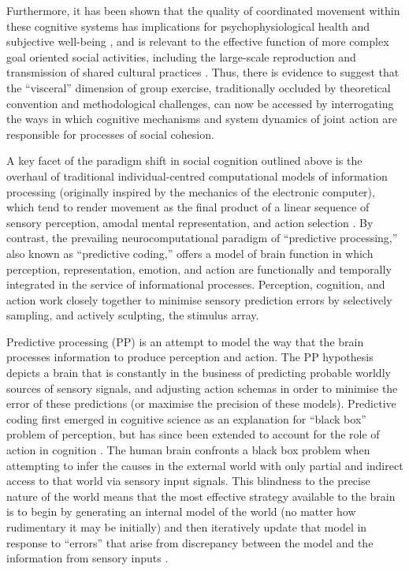 \begin{CJK}{UTF8}{gbsn}
{Furthermore, it has been shown that the quality of coordinated movement within these cognitive systems has implications for psychophysiological health and subjective well-being \citep{Wheatley2012}, and is relevant to the effective function of more complex goal oriented social activities, including the large-scale reproduction and transmission of shared cultural practices \citep{Dunbar2012,Roepstorff2010,Claidiere2014,Launay2016}. Thus, there is evidence to suggest that the ``visceral'' dimension of group exercise, traditionally occluded by theoretical convention and methodological challenges, can now be accessed by interrogating the ways in which cognitive mechanisms and system dynamics of joint action are responsible for processes of social cohesion.

A key facet of the paradigm shift in social cognition outlined above is the overhaul of traditional individual-centred computational models of information processing (originally inspired by the mechanics of the electronic computer), which tend to render movement as the final product of a linear sequence of sensory perception, amodal mental representation, and action selection \citep{Lewis2005}.  By contrast, the prevailing neurocomputational paradigm of ``predictive processing,'' also known as ``predictive coding,'' \citep[see][]{Frith2007,Kilner2009,Clark2013} offers a model of brain function in which perception, representation, emotion, and action are functionally and temporally integrated in the service of informational processes.  Perception, cognition, and action work closely together to minimise sensory prediction errors by selectively sampling, and actively sculpting, the stimulus array.







Predictive processing (PP) is an attempt to model the way that the brain processes information to produce perception and action. The PP hypothesis depicts a brain that is constantly in the business of predicting probable worldly sources of sensory signals, and adjusting action schemas in order to minimise the error of these predictions (or maximise the precision of these models). Predictive coding first emerged in cognitive science as an explanation for ``black box'' problem of perception, but has since been extended to account for the role of action in cognition \citep{Friston2010}.
The human brain confronts a black box problem when attempting to infer the causes in the external world with only partial and indirect access to that world via sensory input signals. This blindness to the precise nature of the world means that the most effective strategy available to the brain is to begin by generating an internal model of the world (no matter how rudimentary it may be initially) and then iteratively update that model in response to ``errors'' that arise from discrepancy between the model and the information from sensory inputs \citep{Frith2007}.

}
\end{CJK}
